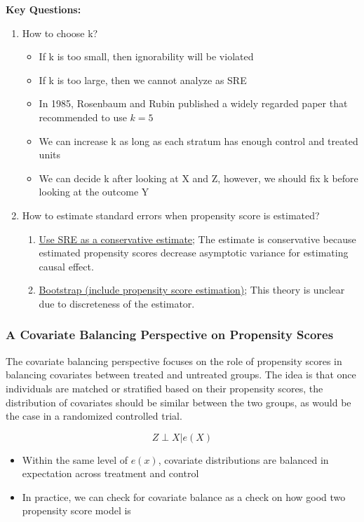 \textbf{Key Questions:}
\begin{enumerate}
    \item How to choose k?
    \begin{itemize}
        \item If k is too small, then ignorability will be violated
        \item If k is too large, then we cannot analyze as SRE
        \item In 1985, Rosenbaum and Rubin published a widely regarded paper that recommended to use $k=5$
        \item We can increase k as long as each stratum has enough control and treated units
        \item We can decide k after looking at X and Z, however, we should fix k before looking at the outcome Y
    \end{itemize}
    \item How to estimate standard errors when propensity score is estimated?
    \begin{enumerate}
        \item \underline{Use SRE as a conservative estimate}; The estimate is conservative because estimated propensity scores decrease asymptotic variance for estimating causal effect.
        \item \underline{Bootstrap (include propensity score estimation)}; This theory is unclear due to discreteness of the estimator.
    \end{enumerate}
\end{enumerate}

\subsubsection{A Covariate Balancing Perspective on Propensity Scores}
The covariate balancing perspective focuses on the role of propensity scores in balancing covariates between treated and untreated groups. The idea is that once individuals are matched or stratified based on their propensity scores, the distribution of covariates should be similar between the two groups, as would be the case in a randomized controlled trial.

$$ Z \perp X | e(X)$$

\begin{itemize}
    \item Within the same level of $e(x)$, covariate distributions are balanced in expectation across treatment and control
    \item In practice, we can check for covariate balance as a check on how good two propensity score model is
\end{itemize}

